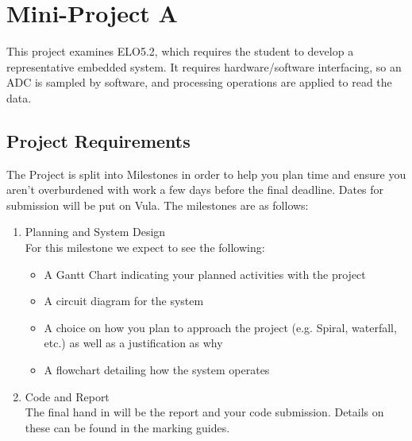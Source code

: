 \chapter{Mini-Project A}
\label{sec:ProjA}
This project examines ELO5.2, which requires the student to develop a representative embedded system. It requires hardware/software interfacing, so an ADC is sampled by software, and processing operations are applied to read the data. 

\section{Project Requirements}
The Project is split into Milestones in order to help you plan time and ensure you aren't overburdened with work a few days before the final deadline. Dates for submission will be put on Vula. The milestones are as follows:
\begin{enumerate}
    \renewcommand{\theenumi}{\Alph{enumi}}
    \item Planning and System Design\\
    For this milestone we expect to see the following:
    \begin{itemize}
        \item A Gantt Chart indicating your planned activities with the project
        \item A circuit diagram for the system
        \item A choice on how you plan to approach the project (e.g. Spiral, waterfall, etc.) as well as a justification as why
        \item A flowchart detailing how the system operates
    \end{itemize}
    \item Code and Report\\
    The final hand in will be the report and your code submission. Details on these can be found in the marking guides.
\end{enumerate}

